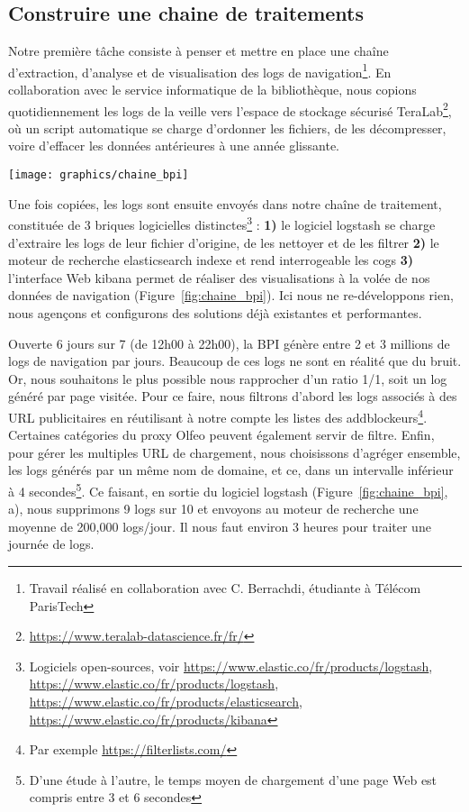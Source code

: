 \documentclass[symmetric,justified,marginals=raggedouter]{tufte-book}
\begin{document}
\subsection{Construire une chaine de traitements}

\noindent Notre première tâche consiste à penser et mettre en place une chaîne d'extraction, d'analyse et de visualisation des logs de navigation\footnote{\RaggedOuter Travail réalisé en collaboration avec C. Berrachdi, étudiante à Télécom ParisTech}. En collaboration avec le service informatique de la bibliothèque, nous copions quotidiennement les logs de la veille vers l'espace de stockage sécurisé TeraLab\footnote{\RaggedOuter \url{https://www.teralab-datascience.fr/fr/}}, où un script automatique se charge d'ordonner les fichiers, de les décompresser, voire d'effacer les données antérieures à une année glissante. 

\begin{figure*}
  \texttt{[image: graphics/chaine\_bpi]}
  \caption{Chaine de traitement des logs de navigation de la BPI}
  \label{fig:chaine_bpi}
\end{figure*}

\noindent Une fois copiées, les logs sont ensuite envoyés dans notre chaîne de traitement, constituée de 3 briques logicielles distinctes\footnote{\RaggedOuter Logiciels open-sources, voir \url{https://www.elastic.co/fr/products/logstash}, \url{https://www.elastic.co/fr/products/logstash}, \url{https://www.elastic.co/fr/products/elasticsearch}, \url{https://www.elastic.co/fr/products/kibana}} : \textbf{1)} le logiciel logstash se charge d'extraire les logs de leur fichier d'origine, de les nettoyer et de les filtrer \textbf{2)} le moteur de recherche elasticsearch indexe et rend interrogeable les cogs \textbf{3)} l'interface Web kibana permet de réaliser des visualisations à la volée de nos données de navigation (Figure~\ref{fig:chaine_bpi}). Ici nous ne re-développons rien, nous agençons et configurons des solutions déjà existantes et performantes. 

Ouverte 6 jours sur 7 (de 12h00 à 22h00), la BPI génère entre 2 et 3 millions de logs de navigation par jours. Beaucoup de ces logs ne sont en réalité que du bruit. Or, nous souhaitons le plus possible nous rapprocher d'un ratio 1/1, soit un log généré par page visitée. Pour ce faire, nous filtrons d'abord les logs associés à des URL publicitaires en réutilisant à notre compte les listes des addblockeurs\footnote{\RaggedOuter Par exemple \url{https://filterlists.com/}}. Certaines catégories du proxy Olfeo peuvent également servir de filtre. Enfin, pour gérer les multiples URL de chargement, nous choisissons d'agréger ensemble, les logs générés par un même nom de domaine, et ce, dans un intervalle inférieur à 4 secondes\footnote{\RaggedOuter D'une étude à l'autre, le temps moyen de chargement d'une page Web est compris entre 3 et 6 secondes}. Ce faisant, en sortie du logiciel logstash (Figure~\ref{fig:chaine_bpi}, a), nous supprimons 9 logs sur 10 et envoyons au moteur de recherche une moyenne de 200,000 logs/jour. Il nous faut environ 3 heures pour traiter une journée de logs. 
\end{document}
